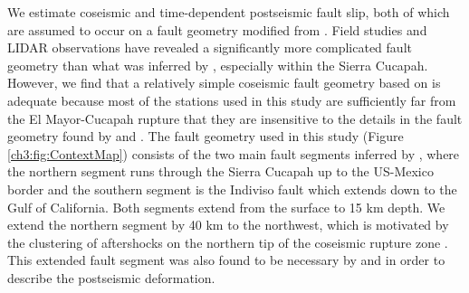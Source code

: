 We estimate coseismic and time-dependent postseismic fault slip, both
of which are assumed to occur on a fault geometry modified from
\citet{Wei2011}.  Field studies \citep{Fletcher2014} and LIDAR
observations \citep{Oskin2012} have revealed a significantly more
complicated fault geometry than what was inferred by \citet{Wei2011},
especially within the Sierra Cucapah.  However, we find that a
relatively simple coseismic fault geometry based on \citep{Wei2011} is
adequate because most of the stations used in this study are
sufficiently far from the El Mayor-Cucapah rupture that they are
insensitive to the details in the fault geometry found by
\citet{Fletcher2014} and \citet{Oskin2012}.  The fault geometry used
in this study (Figure \ref{ch3:fig:ContextMap}) consists of the two
main fault segments inferred by \citet{Wei2011}, where the northern
segment runs through the Sierra Cucapah up to the US-Mexico border and
the southern segment is the Indiviso fault which extends down to the
Gulf of California. Both segments extend from the surface to 15 km
depth.  We extend the northern segment by 40 km to the northwest,
which is motivated by the clustering of aftershocks on the northern
tip of the coseismic rupture zone \citep{Hauksson2011,Kroll2013}.
This extended fault segment was also found to be necessary by
\citet{Rollins2015} and \citet{Pollitz2012} in order to describe the
postseismic deformation.

